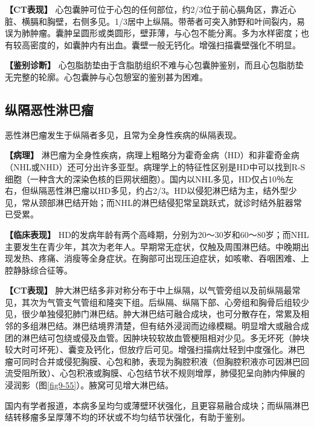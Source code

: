 \textbf{【CT表现】}
心包囊肿可位于心包的任何部位，约2/3位于前心膈角区，靠近心脏、横膈和胸壁，右侧多见。1/3居中上纵隔。带蒂者可突入肺野和叶间裂内，易误为肺肿瘤。囊肿呈圆形或类圆形，壁菲薄，与心包不能分离。多为水样密度；也有较高密度的，如囊肿内有出血。囊壁一般无钙化。增强扫描囊壁强化不明显。

\textbf{【鉴别诊断】}
心包脂肪垫由于含脂肪组织不难与心包囊肿鉴别，而且心包脂肪垫无完整的轮廓。心包囊肿与心包憩室的鉴别甚为困难。

\subsection{纵隔恶性淋巴瘤}

恶性淋巴瘤发生于纵隔者多见，且常为全身性疾病的纵隔表现。

\textbf{【病理】}
淋巴瘤为全身性疾病，病理上粗略分为霍奇金病（HD）和非霍奇金病（NHL或NHD）还可分出许多亚型。病理学上的特征性区别是HD中可以找到R-S细胞（一种含大的深染色核的巨网状细胞）。国内以NHL多见，HD仅占10％左右，但纵隔恶性淋巴瘤以HD多见，约占2/3。HD以侵犯淋巴结为主，结外型少见，常从颈部淋巴结开始；而NHL的淋巴结侵犯常呈跳跃式，就诊时结外脏器常已受累。

\textbf{【临床表现】}
HD的发病年龄有两个高峰期，分别为20～30岁和60～80岁；而NHL主要发生在青少年，其次为老年人。早期常无症状，仅触及周围淋巴结。中晚期出现发热、疼痛、消瘦等全身症状。在胸部可出现压迫症状，如咳嗽、吞咽困难、上腔静脉综合征等。

\textbf{【CT表现】}
肿大淋巴结多非对称分布于中上纵隔，以气管旁组以及前纵隔最常见，其次为气管支气管组和隆突下组。后纵隔、纵隔下部、心旁组和胸骨后组较少见，很少单独侵犯肺门淋巴结。肿大淋巴结可融合成块，也可分散存在，常累及相邻的多组淋巴结。淋巴结境界清楚，但有结外浸润而边缘模糊。明显增大或融合成团的淋巴结可包绕或侵及血管。因肿块较软故血管梗阻相对少见。多无坏死（肿块较大时可坏死）、囊变及钙化，但放疗后可见。增强扫描病灶轻到中度强化。淋巴瘤可同时合并或侵犯胸膜、心包和肺，表现为胸腔积液（但胸腔积液亦可因淋巴回流受阻所致）、心包积液或胸膜、心包结节状不规则增厚，肺侵犯呈向肺内伸展的浸润影（图\ref{fig9-55}）。腋窝可见增大淋巴结。

国内有学者报道，本病多呈均匀或薄壁环状强化，且更容易融合成块；而纵隔淋巴结转移瘤多呈厚薄不均的环状或不均匀结节状强化，有助于鉴别。

